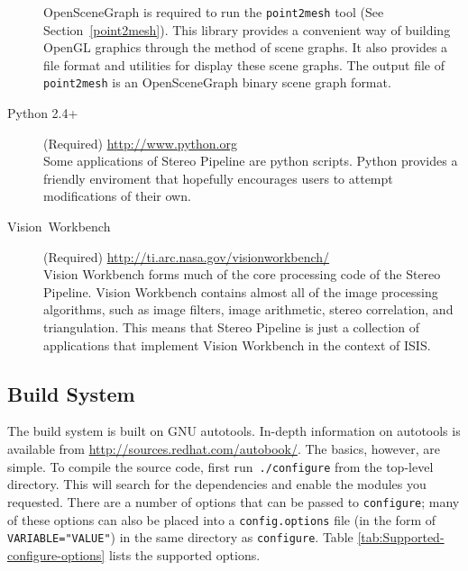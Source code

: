 \begin{description}
OpenSceneGraph is required to run the \texttt{point2mesh} tool (See
Section~\ref{point2mesh}). This library provides a convenient way of
building OpenGL graphics through the method of scene graphs. It also
provides a file format and utilities for display these scene
graphs. The output file of \texttt{point2mesh} is an OpenSceneGraph
binary scene graph format.

\item [{Python 2.4+}] (Required) \url{http://www.python.org}\\

Some applications of Stereo Pipeline are python scripts. Python
provides a friendly enviroment that hopefully encourages users to
attempt modifications of their own.

\item [{Vision~Workbench}] (Required) \url{http://ti.arc.nasa.gov/visionworkbench/}\\

Vision Workbench forms much of the core processing code of the Stereo
Pipeline. Vision Workbench contains almost all of the image processing
algorithms, such as image filters, image arithmetic, stereo
correlation, and triangulation. This means that Stereo Pipeline is
just a collection of applications that implement Vision Workbench in
the context of ISIS.

\end{description}

\subsection{Build System}

The build system is built on GNU autotools. In-depth information on
autotools is available from \url{http://sources.redhat.com/autobook/}.
The basics, however, are simple. To compile the source code, first
run~\verb#./configure# from the top-level directory. This will search
for the dependencies and enable the modules you requested. There are
a number of options that can be passed to \verb#configure#; many
of these options can also be placed into a \verb#config.options#
file (in the form of \verb#VARIABLE="VALUE"#) in the same directory
as \verb#configure#. Table \ref{tab:Supported-configure-options}
lists the supported options.

